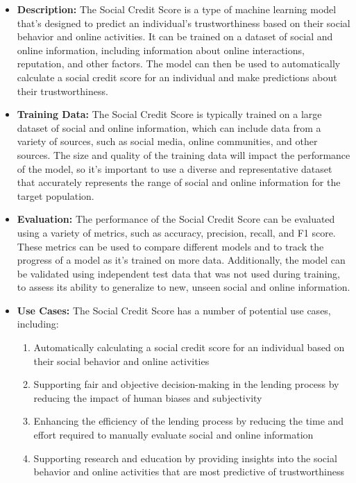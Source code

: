 \begin{itemize}
\begin{itemize}
    \item \textbf{Description:} The Social Credit Score is a type of machine learning model that's designed to predict an individual's trustworthiness based on their social behavior and online activities. It can be trained on a dataset of social and online information, including information about online interactions, reputation, and other factors. The model can then be used to automatically calculate a social credit score for an individual and make predictions about their trustworthiness.
    \item \textbf{Training Data:} The Social Credit Score is typically trained on a large dataset of social and online information, which can include data from a variety of sources, such as social media, online communities, and other sources. The size and quality of the training data will impact the performance of the model, so it's important to use a diverse and representative dataset that accurately represents the range of social and online information for the target population.
    \item \textbf{Evaluation:} The performance of the Social Credit Score can be evaluated using a variety of metrics, such as accuracy, precision, recall, and F1 score. These metrics can be used to compare different models and to track the progress of a model as it's trained on more data. Additionally, the model can be validated using independent test data that was not used during training, to assess its ability to generalize to new, unseen social and online information.
    \item \textbf{Use Cases:} The Social Credit Score has a number of potential use cases, including:
        \begin{enumerate}  
            \item Automatically calculating a social credit score for an individual based on their social behavior and online activities
            \item Supporting fair and objective decision-making in the lending process by reducing the impact of human biases and subjectivity
            \item Enhancing the efficiency of the lending process by reducing the time and effort required to manually evaluate social and online information
            \item Supporting research and education by providing insights into the social behavior and online activities that are most predictive of trustworthiness

\end{enumerate}
\end{itemize}
\end{itemize}
